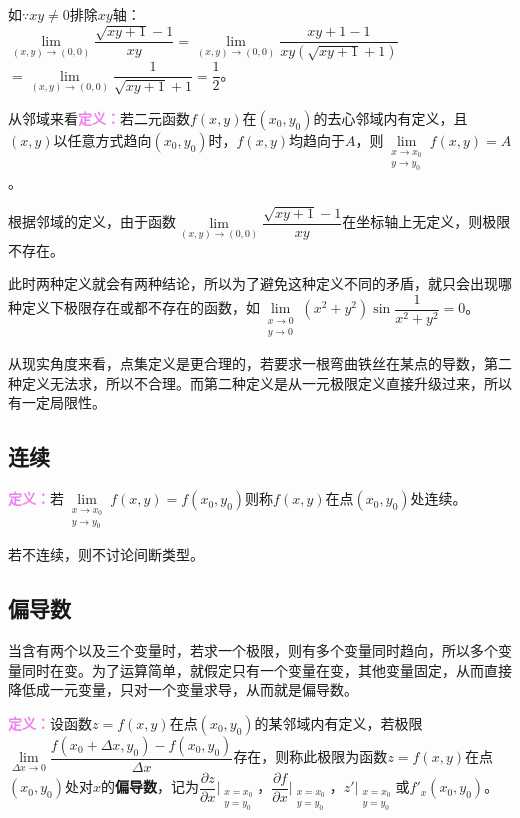 \documentclass[UTF8, 12pt]{ctexart}
\begin{document}
        如$\because xy\neq0$排除$xy$轴：$\lim\limits_{(x,y)\to(0,0)}\dfrac{\sqrt{xy+1}-1}{xy}=\lim\limits_{(x,y)\to(0,0)}\dfrac{xy+1-1}{xy(\sqrt{xy+1}+1)}$\\$=\lim\limits_{(x,y)\to(0,0)}\dfrac{1}{\sqrt{xy+1}+1}=\dfrac{1}{2}$。\medskip

        从邻域来看\textcolor{violet}{\textbf{定义：}}若二元函数$f(x,y)$在$(x_0,y_0)$的去心邻域内有定义，且$(x,y)$以任意方式趋向$(x_0,y_0)$时，$f(x,y)$均趋向于$A$，则$\lim\limits_{\substack{x\to x_0\\y\to y_0}}f(x,y)=A$。

        根据邻域的定义，由于函数$\lim\limits_{(x,y)\to(0,0)}\dfrac{\sqrt{xy+1}-1}{xy}$在坐标轴上无定义，则极限不存在。

        此时两种定义就会有两种结论，所以为了避免这种定义不同的矛盾，就只会出现哪种定义下极限存在或都不存在的函数，如$\lim\limits_{\substack{x\to0\\y\to0}}(x^2+y^2)\sin\dfrac{1}{x^2+y^2}=0$。

        从现实角度来看，点集定义是更合理的，若要求一根弯曲铁丝在某点的导数，第二种定义无法求，所以不合理。而第二种定义是从一元极限定义直接升级过来，所以有一定局限性。

        \subsection{连续}

        \textcolor{violet}{\textbf{定义：}}若$\lim\limits_{\substack{x\to x_0\\y\to y_0}}f(x,y)=f(x_0,y_0)$则称$f(x,y)$在点$(x_0,y_0)$处连续。

        若不连续，则不讨论间断类型。

        \subsection{偏导数}

        当含有两个以及三个变量时，若求一个极限，则有多个变量同时趋向，所以多个变量同时在变。为了运算简单，就假定只有一个变量在变，其他变量固定，从而直接降低成一元变量，只对一个变量求导，从而就是偏导数。

        \textcolor{violet}{\textbf{定义：}}设函数$z=f(x,y)$在点$(x_0,y_0)$的某邻域内有定义，若极限\\$\lim\limits_{\Delta x\to0}\dfrac{f(x_0+\Delta x,y_0)-f(x_0,y_0)}{\Delta x}$存在，则称此极限为函数$z=f(x,y)$在点$(x_0,y_0)$处对$x$的\textbf{偏导数}，记为$\dfrac{\partial z}{\partial x}\bigg|_{\substack{x=x_0\\y=y_0}}$，$\dfrac{\partial f}{\partial x}\bigg|_{\substack{x=x_0\\y=y_0}}$，$z'\bigg|_{\substack{x=x_0\\y=y_0}}$或$f'_x(x_0,y_0)$。\medskip
\end{document}
